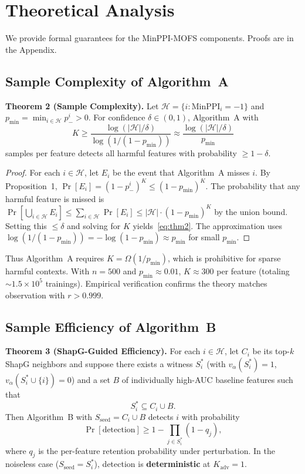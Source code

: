 \documentclass{article} %
\begin{document}
\section{Theoretical Analysis}
\label{sec:theory}

We provide formal guarantees for the MinPPI-MOFS components. Proofs are in the Appendix.

\subsection{Sample Complexity of Algorithm~A}

\textbf{Theorem 2 (Sample Complexity).}
Let $\mathcal{H} = \{i : \text{MinPPI}_i = -1\}$ and $p_{\min} = \min_{i\in\mathcal{H}} p_-^i > 0$. For confidence $\delta\in(0,1)$, Algorithm~A with
\begin{equation}
K \geq \frac{\log(|\mathcal{H}| / \delta)}{\log(1/(1-p_{\min}))} \approx \frac{\log(|\mathcal{H}|/\delta)}{p_{\min}}
\label{eq:thm2}
\end{equation}
samples per feature detects all harmful features with probability $\geq 1-\delta$.

\begin{proof}
For each $i \in \mathcal{H}$, let $E_i$ be the event that Algorithm~A misses $i$. By Proposition~1, $\Pr[E_i] = (1 - p_-^i)^K \leq (1 - p_{\min})^K$. The probability that any harmful feature is missed is $\Pr[\bigcup_{i \in \mathcal{H}} E_i] \leq \sum_{i \in \mathcal{H}} \Pr[E_i] \leq |\mathcal{H}| \cdot (1 - p_{\min})^K$ by the union bound. Setting this $\leq \delta$ and solving for $K$ yields~\eqref{eq:thm2}. The approximation uses $\log(1/(1-p_{\min})) = -\log(1-p_{\min}) \approx p_{\min}$ for small $p_{\min}$.
\end{proof}

Thus Algorithm~A requires $K=\Omega(1/p_{\min})$, which is prohibitive for sparse harmful contexts. With $n=500$ and $p_{\min}\approx0.01$, $K \approx 300$ per feature (totaling $\sim1.5\times10^5$ trainings). Empirical verification confirms the theory matches observation with $r > 0.999$.

\subsection{Sample Efficiency of Algorithm~B}

\textbf{Theorem 3 (ShapG-Guided Efficiency).}
For each $i\in\mathcal{H}$, let $C_i$ be its top-$k$ ShapG neighbors and suppose there exists a witness $S_i^*$ (with $v_\alpha(S_i^*)=1$, $v_\alpha(S_i^*\cup\{i\})=0$) and a set $B$ of individually high-AUC baseline features such that
\begin{equation}
S_i^* \subseteq C_i \cup B.
\label{eq:structural-cond}
\end{equation}
Then Algorithm~B with $S_{\text{seed}}=C_i\cup B$ detects $i$ with probability
\begin{equation}
\Pr[\text{detection}] \geq 1 - \prod_{j \in S_i^*} (1 - q_j),
\label{eq:thm3}
\end{equation}
where $q_j$ is the per-feature retention probability under perturbation. In the noiseless case ($S_{\text{seed}}=S_i^*$), detection is \textbf{deterministic} at $K_{\text{adv}}=1$.
\end{document}
